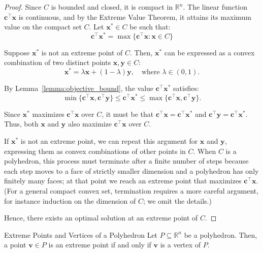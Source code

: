 \begin{proof}
Since \(C\) is bounded and closed, it is compact in \(\mathbb{R}^n\). The linear function \(\mathbf{c}^\top \mathbf{x}\) is continuous, and by the Extreme Value Theorem, it attains its maximum value on the compact set \(C\). Let \(\mathbf{x}^* \in C\) be such that:
\[
\mathbf{c}^\top \mathbf{x}^* = \max \{ \mathbf{c}^\top \mathbf{x} : {\mathbf{x} \in C} \}
\]

Suppose \(\mathbf{x}^*\) is not an extreme point of \(C\). Then, \(\mathbf{x}^*\) can be expressed as a convex combination of two distinct points \(\mathbf{x}, \mathbf{y} \in C\):
\[
\mathbf{x}^* = \lambda \mathbf{x} + (1-\lambda) \mathbf{y}, \quad \text{where } \lambda \in (0, 1).
\]

By Lemma~\ref{lemma:objective_bound}, the value \(\mathbf{c}^\top \mathbf{x}^*\) satisfies:
\[
\min\{\mathbf{c}^\top \mathbf{x}, \mathbf{c}^\top \mathbf{y}\} \leq \mathbf{c}^\top \mathbf{x}^* \leq \max\{\mathbf{c}^\top \mathbf{x}, \mathbf{c}^\top \mathbf{y}\}.
\]

Since \(\mathbf{x}^*\) maximizes \(\mathbf{c}^\top \mathbf{x}\) over \(C\), it must be that \(\mathbf{c}^\top \mathbf{x} = \mathbf{c}^\top \mathbf{x}^*\) and \(\mathbf{c}^\top \mathbf{y} = \mathbf{c}^\top \mathbf{x}^*\). Thus, both \(\mathbf{x}\) and \(\mathbf{y}\) also maximize \(\mathbf{c}^\top \mathbf{x}\) over \(C\).

If \(\mathbf{x}^*\) is not an extreme point, we can repeat this argument for \(\mathbf{x}\) and \(\mathbf{y}\), expressing them as convex combinations of other points in \(C\). When \(C\) is a polyhedron, this process must terminate after a finite number of steps because each step moves to a face of strictly smaller dimension and a polyhedron has only finitely many faces; at that point we reach an extreme point that maximizes \(\mathbf{c}^\top \mathbf{x}\). (For a general compact convex set, termination requires a more careful argument, for instance induction on the dimension of \(C\); we omit the details.)

Hence, there exists an optimal solution at an extreme point of \(C\).
\end{proof}

\begin{theorem}{Extreme Points and Vertices of a Polyhedron}
Let \( P \subseteq \mathbb{R}^n \) be a polyhedron. Then, a point \( \mathbf{v} \in P \) is an extreme point if and only if \( \mathbf{v} \) is a vertex of \( P \).
\end{theorem}

